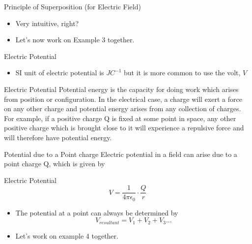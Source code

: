 \documentclass{beamer}
\begin{document}
\begin{frame}{Principle of Superposition (for Electric Field)}{}
  \begin{itemize}
\begin{block}{Principle of Superposition (for Electric Field)}
The resultant electric field \(E\) at a point \(P\) in an electric field is the vector sum of the fields at \(P\) due to each point charge in the system.
\end{block}
  \item Very intuitive, right?
  \item Let's now work on Example 3 together.
  \end{itemize}
\end{frame}

\begin{frame}{Electric Potential}{}
  \begin{itemize}
\begin{block}{Definition of Electric Potential}
The electric potential V, at a point in an electric field, is defined as the work done per unit positive charge, by an external force, in moving a small test charge from infinity to that point in the electric field.
\[V=\frac{W}{q}\]
\end{block}
  \item SI unit of electric potential is \(JC^{-1}\) but it is more common to use the volt, \(V\)
  \end{itemize}
\end{frame}

\begin{frame}{Electric Potential}{}
Potential energy is the capacity for doing work which arises from position or configuration. In the electrical case, a charge will exert a force on any other charge and potential energy arises from any collection of charges. For example, if a positive charge Q is fixed at some point in space, any other positive charge which is brought close to it will experience a repulsive force and will therefore have potential energy.
\end{frame}

\begin{frame}{Potential due to a Point charge}{}
Electric potential in a field can arise due to a point charge Q, which is given by
\begin{block}{Electric Potential}
\[V=\frac{1}{4\pi \epsilon_0} \cdot \frac{Q}{r} \]
\end{block}
  \begin{itemize}
  \item The potential at a point can always be determined by
  \[V_{resultant} = V_1 + V_2 + V_3...\]
  \item Let's work on example 4 together.
  \end{itemize}
\end{frame}
\end{document}
